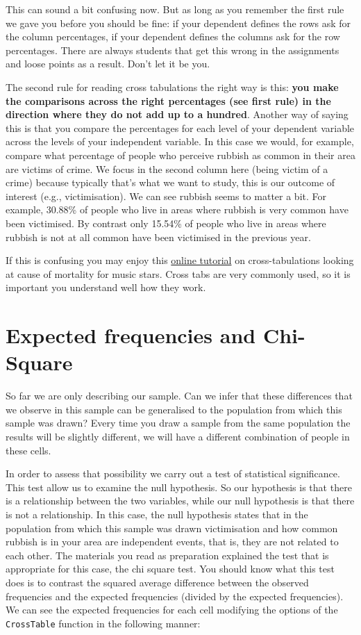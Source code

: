 \documentclass[
]{book}
\begin{document}
This can sound a bit confusing now. But as long as you remember the first rule we gave you before you should be fine: if your dependent defines the rows ask for the column percentages, if your dependent defines the columns ask for the row percentages. There are always students that get this wrong in the assignments and loose points as a result. Don't let it be you.

The second rule for reading cross tabulations the right way is this: \textbf{you make the comparisons across the right percentages (see first rule) in the direction where they do not add up to a hundred}. Another way of saying this is that you compare the percentages for each level of your dependent variable across the levels of your independent variable. In this case we would, for example, compare what percentage of people who perceive rubbish as common in their area are victims of crime. We focus in the second column here (being victim of a crime) because typically that's what we want to study, this is our outcome of interest (e.g., victimisation). We can see rubbish seems to matter a bit. For example, 30.88\% of people who live in areas where rubbish is very common have been victimised. By contrast only 15.54\% of people who live in areas where rubbish is not at all common have been victimised in the previous year.

If this is confusing you may enjoy this \href{http://sonet.nottingham.ac.uk/rlos/ucel/cross_tab_data/main.html}{online tutorial} on cross-tabulations looking at cause of mortality for music stars. Cross tabs are very commonly used, so it is important you understand well how they work.

\hypertarget{expected-frequencies-and-chi-square}{%
\section{Expected frequencies and Chi-Square}\label{expected-frequencies-and-chi-square}}

So far we are only describing our sample. Can we infer that these differences that we observe in this sample can be generalised to the population from which this sample was drawn? Every time you draw a sample from the same population the results will be slightly different, we will have a different combination of people in these cells.

In order to assess that possibility we carry out a test of statistical significance. This test allow us to examine the null hypothesis. So our hypothesis is that there is a relationship between the two variables, while our null hypothesis is that there is not a relationship. In this case, the null hypothesis states that in the population from which this sample was drawn victimisation and how common rubbish is in your area are independent events, that is, they are not related to each other. The materials you read as preparation explained the test that is appropriate for this case, the chi square test. You should know what this test does is to contrast the squared average difference between the observed frequencies and the expected frequencies (divided by the expected frequencies). We can see the expected frequencies for each cell modifying the options of the \texttt{CrossTable} function in the following manner:
\end{document}
